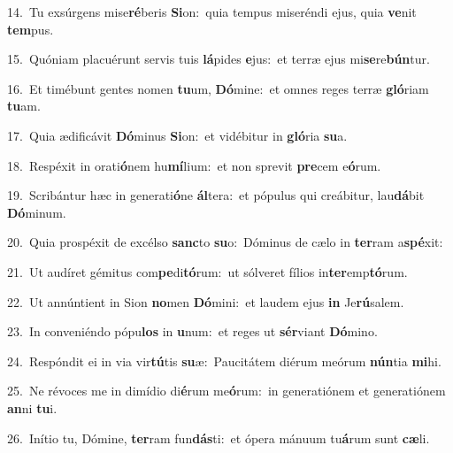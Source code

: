 {\numbfont\textcolor{\numbcolor}{14.}}~Tu exsúrgens mise\-\textbf{ré}\-beris \textbf{Si}\-on:~\star quia tempus miseréndi ejus, quia \textbf{ve}\-nit \textbf{tem}\-pus.\par
{\numbfont\textcolor{\numbcolor}{15.}}~Quóniam placuérunt servis tuis \textbf{lá}\-pides \textbf{e}\-jus:~\star et terræ ejus mi\-\textbf{se}\-re\-\textbf{bún}\-tur.\par
{\numbfont\textcolor{\numbcolor}{16.}}~Et timébunt gentes nomen \textbf{tu}\-um, \textbf{Dó}\-mine:~\star et omnes reges terræ \textbf{gló}\-riam \textbf{tu}\-am.\par
{\numbfont\textcolor{\numbcolor}{17.}}~Quia ædificávit \textbf{Dó}\-minus \textbf{Si}\-on:~\star et vidébitur in \textbf{gló}\-ria \textbf{su}\-a.\par
{\numbfont\textcolor{\numbcolor}{18.}}~Respéxit in orati\-\textbf{ó}\-nem hu\-\textbf{mí}\-lium:~\star et non sprevit \textbf{pre}\-cem e\-\textbf{ó}\-rum.\par
{\numbfont\textcolor{\numbcolor}{19.}}~Scribántur hæc in generati\-\textbf{ó}\-ne \textbf{ál}\-tera:~\star et pópulus qui creábitur, lau\-\textbf{dá}\-bit \textbf{Dó}\-minum.\par
{\numbfont\textcolor{\numbcolor}{20.}}~Quia prospéxit de excélso \textbf{sanc}\-to \textbf{su}\-o:~\star Dóminus de cælo in \textbf{ter}\-ram a\-\textbf{spé}\-xit:\par
{\numbfont\textcolor{\numbcolor}{21.}}~Ut audíret gémitus com\-\textbf{pe}\-di\-\textbf{tó}\-rum:~\star ut sólveret fílios in\-\textbf{ter}\-emp\-\textbf{tó}\-rum.\par
{\numbfont\textcolor{\numbcolor}{22.}}~Ut annúntient in Sion \textbf{no}\-men \textbf{Dó}\-mini:~\star et laudem ejus \textbf{in} Je\-\textbf{rú}\-salem.\par
{\numbfont\textcolor{\numbcolor}{23.}}~In conveniéndo pópu\textbf{los} in \textbf{u}\-num:~\star et reges ut \textbf{sér}\-viant \textbf{Dó}\-mino.\par
{\numbfont\textcolor{\numbcolor}{24.}}~Respóndit ei in via vir\-\textbf{tú}\-tis \textbf{su}\-æ:~\star Paucitátem diérum meórum \textbf{nún}\-tia \textbf{mi}\-hi.\par
{\numbfont\textcolor{\numbcolor}{25.}}~Ne révoces me in dimídio di\-\textbf{é}\-rum me\-\textbf{ó}\-rum:~\star in generatiónem et generatiónem \textbf{an}\-ni \textbf{tu}\-i.\par
{\numbfont\textcolor{\numbcolor}{26.}}~Inítio tu, Dómine, \textbf{ter}\-ram fun\-\textbf{dás}\-ti:~\star et ópera mánuum tu\-\textbf{á}\-rum sunt \textbf{cæ}\-li.\par
